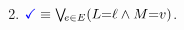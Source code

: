 \begin{multicols}{2}
\begin{enumerate}[topsep=0pt,label=(\textsc{w}\arabic*),ref=\textsc{w}\arabic*]
{\begin{math}
      \end{math}}
  \item \label{write-term-addr}
    $\aTerm \riff {\textstyle\bigvee{}\!\!{}_{\aEv\in\aEvs}\PBR{\cExp{=}\cVal \land \aExp{=}\aVal}}$.
  \end{enumerate}
\end{multicols}


